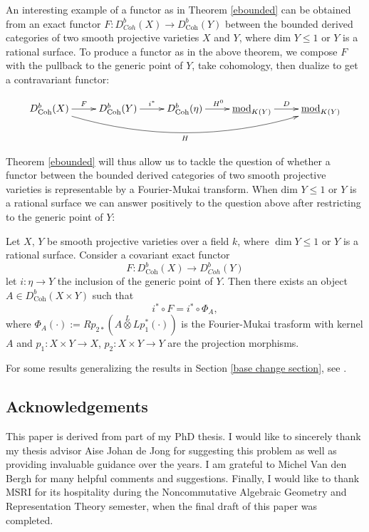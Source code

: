 \documentclass{amsart}
\begin{document}
An interesting example of a functor as in Theorem \ref{ebounded} can be obtained from an exact functor $F:D^{b}_{Coh}(X)\to D^{b}_{\mathrm{Coh}}(Y)$ between the bounded derived categories of two smooth projective varieties $X$ and $Y$, where $\text{dim } Y\leq 1$ or $Y$ is a rational surface. To produce a functor as in the above theorem, we compose $F$ with the pullback to the generic point of $Y$, take cohomology, then dualize to get a contravariant functor:

$$\xymatrix{
D^{b}_{\mathrm{Coh}}(X) \ar@/_2
pc/ [rrrr]_{H}  \ar[r]^-{F} & D^{b}_{\mathrm{Coh}}(Y) \ar[r]^-{i^{*}} & D^{b}_{\mathrm{Coh}}(\eta) \ar[r]^{H^{0}} & \underline{\mathrm{mod}}_{K(Y)} \ar[r]^{D} &\underline{\mathrm{mod}}_{K(Y)}
}$$

Theorem \ref{ebounded} will thus allow us to tackle the question of whether a functor between the bounded derived categories of two smooth projective varieties is representable by a Fourier-Mukai transform. When $\text{dim }Y\leq 1$ or $Y$ is a rational surface we can answer positively to the question above after restricting to the generic point of $Y$: 

\begin{theorem}\label{FM}
Let $X$, $Y$ be smooth projective varieties over a field $k$, where $\dim Y\leq 1$ or $Y$ is a rational surface. Consider a covariant exact functor
$$F: D^{b}_{\mathrm{Coh}}(X) \rightarrow D^{b}_{Coh}(Y)$$
let $i: \eta{\rightarrow} Y$ the inclusion of the generic point of $Y$. Then there exists an object $A\in D^{b}_{\mathrm{Coh}}(X\times Y)$ such that 
$$ i^{*}\circ F =  i^{*}\circ \Phi_{A},$$
where $\Phi_{A}(\cdot):=Rp_{2*}(A\stackrel{L}{\otimes} Lp_{1}^{*}(\cdot))$ is the Fourier-Mukai trasform with kernel $A$ and $p_{1}: X\times Y\to X$, $p_{2}:X\times Y\to Y$ are the projection morphisms.
\end{theorem}

For some results generalizing the results in Section \ref{base change section}, see \cite{scalar}.

\subsection*{Acknowledgements}This paper is derived from part of my PhD thesis. I would like to sincerely thank my thesis advisor Aise Johan de Jong for suggesting this problem as well as providing invaluable guidance over the years. I am grateful to Michel Van den Bergh for many helpful comments and suggestions. Finally, I would like to thank MSRI for its hospitality during the Noncommutative Algebraic Geometry and Representation Theory semester, when the final draft of this paper was completed.
\end{document}
